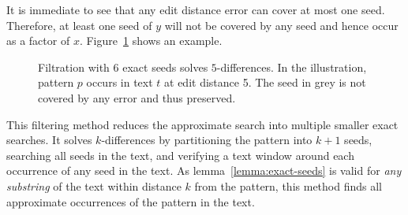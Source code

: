 It is immediate to see that any edit distance error can cover at most one seed.
Therefore, at least one seed of $y$ will not be covered by any seed and hence occur as a factor of $x$.
Figure~\ref{fig:seeds-ext} shows an example.

\begin{figure}[h]
\begin{center}
\caption[Filtration with exact seeds]{Filtration with 6 exact seeds solves $5$-differences. In the illustration, pattern $p$ occurs in text $t$ at edit distance 5. The seed in grey is not covered by any error and thus preserved.}
\label{fig:seeds-ext}

\end{center}
\end{figure}

This filtering method reduces the approximate search into multiple smaller exact searches.
It solves $k$-differences by partitioning the pattern into $k+1$ seeds, searching all seeds in the text, and verifying a text window around each occurrence of any seed in the text.
As lemma~\ref{lemma:exact-seeds} is valid for \emph{any substring} of the text within distance $k$ from the pattern, this method finds all approximate occurrences of the pattern in the text.

